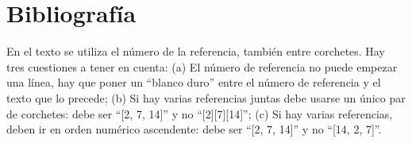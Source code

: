 \documentclass[twocolumn,twoside,a4paper, 10pt]{article}
\begin{document}


\section{Bibliografía}
En el texto se utiliza el número de la referencia, también entre 
corchetes. Hay tres cuestiones a tener en cuenta: (a) El número de 
referencia no puede empezar una línea, hay que poner un ``blanco 
duro'' entre el número de referencia y el texto que lo precede; (b) 
Si hay varias referencias juntas debe usarse un único par de 
corchetes: debe ser ``[2, 7, 14]'' y no ``[2][7][14]''; (c) Si hay 
varias referencias, deben ir en orden numérico ascendente: debe ser  
``[2, 7, 14]'' y no ``[14, 2, 7]''.
\end{document}
